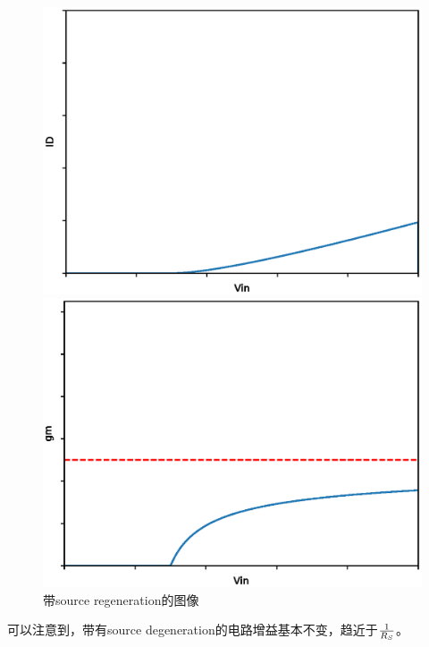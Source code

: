 \documentclass[twoside,a4paper,openright,titlepage,draft]{ctexrep}
\begin{document}
\begin{figure}[H]
    \centering
    \begin{minipage}{0.49\linewidth}
        \centering
        \includegraphics[width=\linewidth]{yesdegeneration1.eps}
    \end{minipage}
    \begin{minipage}{0.49\linewidth}
        \centering
        \includegraphics[width=\linewidth]{yesdegeneration2.eps}
    \end{minipage}
    \caption{带source regeneration的图像}
    \label{fig:带degeneration的图像}
\end{figure}

可以注意到，带有source degeneration的电路增益基本不变，趋近于$1 \over R_S$。
\end{document}
